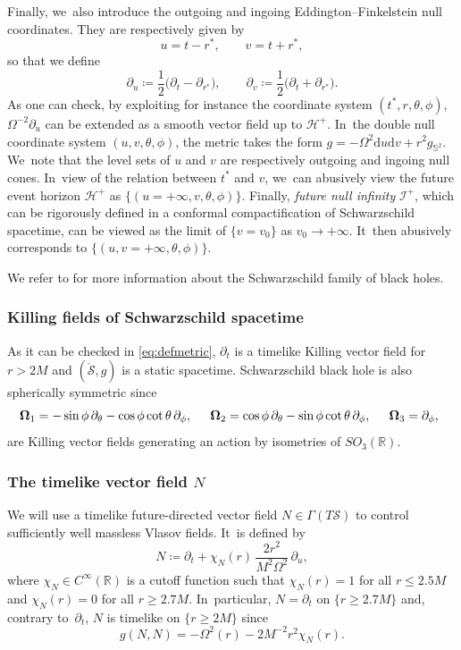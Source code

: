 \documentclass[JEP,XML,SOM,Unicode,published]{cedram}
\theoremstyle{plain}
\theoremstyle{definition}
\newcommand\R{{\mathbb{R}}}
\newcommand\dr{{\mathrm{d}}}
\begin{document}
Finally, we~also introduce the outgoing and ingoing Eddington--Finkelstein null coordinates. They are respectively given by
\[
u=t-r^*, \qquad v=t+r^*,
\]
so that we define
\[
\partial_u \coloneqq \frac{1}{2} \bigl(\partial_t - \partial_{r^*} \bigr), \qquad \partial_v \coloneqq \frac{1}{2} \bigl(\partial_t + \partial_{r^*} \bigr).
\]
As one can check, by exploiting for instance the coordinate system $(t^*,r,\theta,\phi)$, $\Omega^{-2} \partial_u$ can be extended as a smooth vector field up to $\mathcal{H}^+$. In~the double null coordinate system $(u,v,\theta,\phi)$, the metric takes the form $g=-\Omega^2 \dr u \dr v +r^2 g_{\mathbb{S}^2}$. We~note that the level sets of $u$ and $v$ are respectively outgoing and ingoing null cones. In~view of the relation between $t^*$ and $v$, we~can abusively view the future event horizon $\mathcal{H}^+$ as $\{(u=+\infty, v,\theta,\phi)\}$. Finally, \textit{future null infinity} $\mathcal{I}^{+}$, which can be rigorously defined in a conformal compactification of Schwarzschild spacetime, can be viewed as the limit of $\{v=v_0\}$ as $v_0 \to +\infty$. It~then abusively corresponds to $\{(u,v=+\infty,\theta,\phi)\}$.

We refer to \cite[Ch.\,13]{O83} for more information about the Schwarzschild family of black holes.

\subsubsection{Killing fields of Schwarzschild spacetime}

As it can be checked in \eqref{eq:defmetric}, $\partial_t$ is a timelike Killing vector field for $r>2M$ and $(\mathring{\mathcal{S}},g)$ is a static spacetime. Schwarzschild black hole is also spherically symmetric since
\begin{equation}\label{killing_sph_symm}
\hspace{-1.8mm} \mathbf{\Omega}_1=-\sin \phi\,\partial_{\theta}-\cos \phi\cot\theta\,\partial_{\phi}, \quad \; \, \mathbf{\Omega}_2=\cos \phi \,\partial_{\theta}-\sin\phi \cot \theta \,\partial_{\phi},\quad \; \, \mathbf{\Omega}_3=\partial_{\phi},
\end{equation}
are Killing vector fields generating an action by isometries of $SO_3(\R)$.

\subsubsection{The timelike vector field $N$} We will use a timelike future-directed vector field $N \in \Gamma(T\mathcal{S})$ to control sufficiently well massless Vlasov fields. It~is defined by
\[
N \coloneqq \partial_t+ \chi_N (r)\, \frac{2r^2}{M^2\Omega^2}\, \partial_u,
\]
where $\chi_N \in C^\infty (\R)$ is a cutoff function such that $\chi_N (r)=1$ for all $r \leq 2.5M$ and $\chi_N (r) =0$ for all $r \geq 2.7M$. In~particular, $N=\partial_t$ on $\{ r \geq 2.7M \}$ and, contrary to~$\partial_t$, $N$ is timelike on $\{ r \geq 2M \}$ since
\[
g(N,N)=-\Omega^2(r)-2M^{-2}r^2 \chi_N (r).
\]
\end{document}
